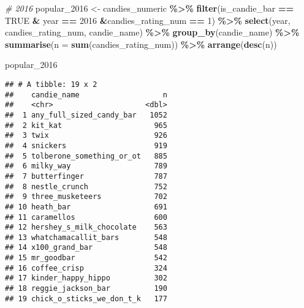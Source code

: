 \documentclass[
]{article}
\newenvironment{Shaded}{\begin{snugshade}}{\end{snugshade}}
\newcommand{\AttributeTok}[1]{\textcolor[rgb]{0.13,0.29,0.53}{#1}}
\newcommand{\CommentTok}[1]{\textcolor[rgb]{0.56,0.35,0.01}{\textit{#1}}}
\newcommand{\ConstantTok}[1]{\textcolor[rgb]{0.56,0.35,0.01}{#1}}
\newcommand{\DecValTok}[1]{\textcolor[rgb]{0.00,0.00,0.81}{#1}}
\newcommand{\FunctionTok}[1]{\textcolor[rgb]{0.13,0.29,0.53}{\textbf{#1}}}
\newcommand{\NormalTok}[1]{#1}
\newcommand{\OtherTok}[1]{\textcolor[rgb]{0.56,0.35,0.01}{#1}}
\newcommand{\SpecialCharTok}[1]{\textcolor[rgb]{0.81,0.36,0.00}{\textbf{#1}}}
\begin{document}
\begin{Shaded}
\begin{Highlighting}[]
\CommentTok{\# 2016}
\NormalTok{popular\_2016 }\OtherTok{\textless{}{-}}\NormalTok{ candies\_numeric }\SpecialCharTok{\%\textgreater{}\%} 
  \FunctionTok{filter}\NormalTok{(is\_candie\_bar }\SpecialCharTok{==} \ConstantTok{TRUE} \SpecialCharTok{\&}\NormalTok{ year }\SpecialCharTok{==} \DecValTok{2016} \SpecialCharTok{\&}\NormalTok{candies\_rating\_num }\SpecialCharTok{==} \DecValTok{1}\NormalTok{) }\SpecialCharTok{\%\textgreater{}\%} 
  \FunctionTok{select}\NormalTok{(year, candies\_rating\_num, candie\_name) }\SpecialCharTok{\%\textgreater{}\%}
  \FunctionTok{group\_by}\NormalTok{(candie\_name) }\SpecialCharTok{\%\textgreater{}\%} 
  \FunctionTok{summarise}\NormalTok{(}\AttributeTok{n =} \FunctionTok{sum}\NormalTok{(candies\_rating\_num)) }\SpecialCharTok{\%\textgreater{}\%} 
  \FunctionTok{arrange}\NormalTok{(}\FunctionTok{desc}\NormalTok{(n))}

\NormalTok{popular\_2016 }
\end{Highlighting}
\end{Shaded}

\begin{verbatim}
## # A tibble: 19 x 2
##    candie_name                   n
##    <chr>                     <dbl>
##  1 any_full_sized_candy_bar   1052
##  2 kit_kat                     965
##  3 twix                        926
##  4 snickers                    919
##  5 tolberone_something_or_ot   885
##  6 milky_way                   789
##  7 butterfinger                787
##  8 nestle_crunch               752
##  9 three_musketeers            702
## 10 heath_bar                   691
## 11 caramellos                  600
## 12 hershey_s_milk_chocolate    563
## 13 whatchamacallit_bars        548
## 14 x100_grand_bar              548
## 15 mr_goodbar                  542
## 16 coffee_crisp                324
## 17 kinder_happy_hippo          302
## 18 reggie_jackson_bar          190
## 19 chick_o_sticks_we_don_t_k   177
\end{verbatim}
\end{document}
